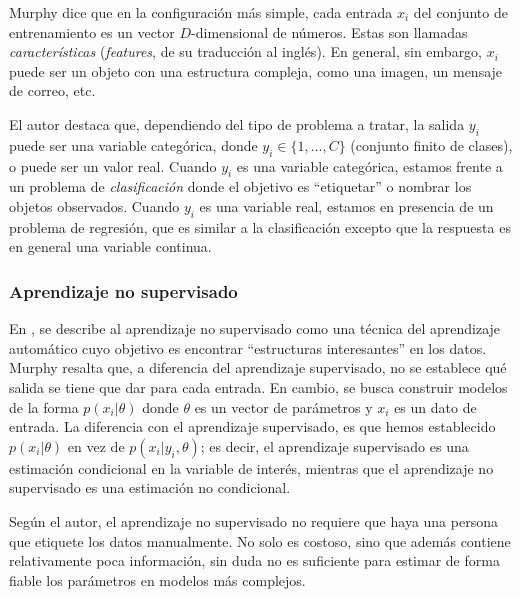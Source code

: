 	Murphy dice que en la configuración más simple, cada entrada $x_i$ del conjunto de entrenamiento es un vector $D$-dimensional de números. Estas son llamadas \textit{características} (\textit{features}, de su traducción al inglés). En general, sin embargo, $x_i$ puede ser un objeto con una estructura compleja, como una imagen, un mensaje de correo, etc.
	
	El autor destaca que, dependiendo del tipo de problema a tratar, la salida $y_i$ puede ser una variable categórica, donde $y_i \in \{1,\dots,C\}$ (conjunto finito de clases), o puede ser un valor real. Cuando $y_i$ es una variable categórica, estamos frente a un problema de \textit{clasificación} donde el objetivo es ``etiquetar'' o nombrar los objetos observados. Cuando $y_i$ es una variable real, estamos en presencia de un problema de regresión, que es similar a la clasificación excepto que la respuesta es en general una variable continua.	
	

	\subsubsection{Aprendizaje no supervisado}
	
		En \cite{Murphy12}, se describe al aprendizaje no supervisado como una técnica del aprendizaje automático cuyo objetivo es encontrar ``estructuras interesantes'' en los datos. Murphy resalta que, a diferencia del aprendizaje supervisado, no se establece qué salida se tiene que dar para cada entrada. En cambio, se busca construir modelos de la forma $p(x_i | \theta)$ donde $\theta$ es un vector de parámetros y $x_i$ es un dato de entrada. La diferencia con el aprendizaje supervisado, es que hemos establecido $p(x_i | \theta)$ en vez de $p(x_i | y_i, \theta)$; es decir, el aprendizaje supervisado es una estimación condicional en la variable de interés, mientras que el aprendizaje no supervisado es una estimación no condicional.
		
		Según el autor, el aprendizaje no supervisado no requiere que haya una persona que etiquete los datos manualmente. No solo es costoso, sino que además contiene relativamente poca información, sin duda no es suficiente para estimar de forma fiable los parámetros en modelos más complejos.